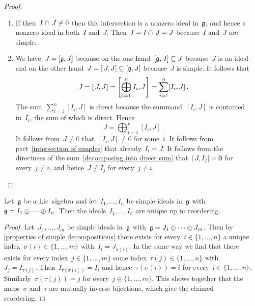 \begin{proof}
  \leavevmode
  \begin{enumerate}
    \item
      If then~$I \cap \, J \neq 0$ then this intersection is a nonzero ideal in~$\mathfrak{g}$, and hence a nonzero ideal in both~$I$ and~$J$.
      Then~$I = I \cap \, J = J$ because~$I$ and~$J$ are simple.
    \item
      We have~$J = [\mathfrak{g}, J]$ because on the one hand~$[\mathfrak{g}, J] \subseteq J$ because~$J$ is an ideal and on the other hand~$J = [\, J,J] \subseteq [\mathfrak{g}, J]$ because~$J$ is simple.
      It follows that
      \[
        J
        =
        [\, J,J]
        =
        \left[ \bigoplus_{i=1}^n I_i, J \right]
        =
        \sum_{i=1}^n [I_i, J] \,.
      \]
      The sum~$\sum_{i=1}^n [I_i, J]$ is direct because the summand~$[I_i, J]$ is contained in~$I_i$, the sum of which is direct.
      Hence
      \begin{equation}
        \label{decomposing into direct sum}
        J
        =
        \bigoplus_{i=1}^n [I_i, J]  \,.
      \end{equation}
      It follows from~$J \neq 0$ that~$[I_i, J] \neq 0$ for some~$i$.
      It follows from part~\ref*{intersection of simples} that already~$I_i = J$.
      It follows from the directness of the sum~\eqref{decomposing into direct sum} that~$[\, J, I_j] = 0$ for every~$j \neq i$, and hence~$J \neq I_j$ for every~$j \neq i$.
    \qedhere
  \end{enumerate}
\end{proof}


\begin{corollary}
  \label{uniqueness of semisimple decomposition}
  Let~$\mathfrak{g}$ be a Lie~algebra and let~$I_1, \dotsc, I_n$ be simple ideals in~$\mathfrak{g}$ with~$\mathfrak{g} = I_1 \oplus \dotsb \oplus I_n$.
  Then the ideals~$I_1, \dotsc, I_n$ are unique up to reordering.
\end{corollary}


\begin{proof}
  Let~$J_1, \dotsc, J_m$ be simple ideals in~$\mathfrak{g}$ with~$\mathfrak{g} = J_1 \oplus \dotsb \oplus J_m$.
  Then by \cref{properties of simple decompositions} there exists for every~$i \in \{1, \dotsc, n\}$ a unique index~$\sigma(i) \in \{1, \dotsc, m\}$ with~$I_i = J_{\sigma(i)}$.
  In the same way we find that there exists for every index~$j \in \{1, \dotsc, m\}$ some index~$\tau(j) \in \{1, \dotsc, n\}$ with~$J_j = I_{\tau(j)}$.
  Then~$I_{\tau(\sigma(i))} = I_i$ and hence~$\tau(\sigma(i)) = i$ for every~$i \in \{1, \dotsc, n\}$.
  Similarly~$\sigma(\tau(j)) = j$ for every~$j \in \{1, \dotsc, m\}$.
  This shows together that the maps~$\sigma$ and~$\tau$ are mutually inverse bijections, which give the claimed reordering.
\end{proof}
 
